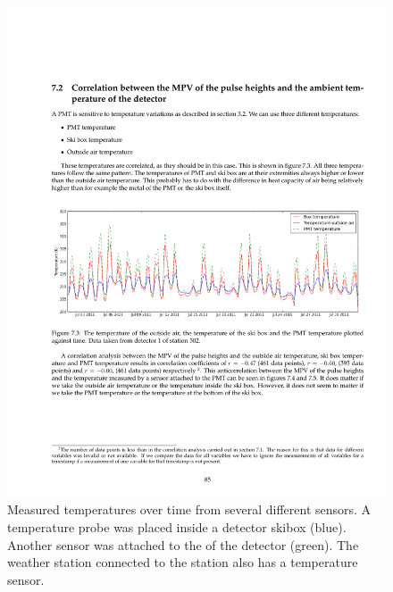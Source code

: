 \begin{figure}
    \centering
    \includegraphics[width=\linewidth]{plots/station/temperature_timeline}
    \caption{Measured temperatures over time from several different sensors. A temperature probe was placed inside a \hisparc detector skibox (blue). Another sensor was attached to the \pmt of the detector (green). The weather station connected to the \hisparc station also has a temperature sensor.}
    \label{fig:temperature_timeline}
\end{figure}

